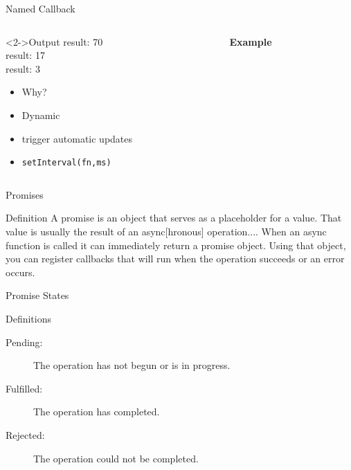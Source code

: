 \documentclass[pdf,table]{beamer}
\begin{document}
\begin{frame}{Named Callback}
	\begin{columns}[T]
		\begin{column}{0.48\textwidth}
			\begin{block}<2->{Output}
				result: 70 \\ result: 17 \\ result: 3
			\end{block}
			\begin{itemize}
				\item Why?
				\item Dynamic
				\item trigger automatic updates
				\item {\tt setInterval(fn,ms)}
			\end{itemize}
			
		\end{column}
		\begin{column}{0.48\textwidth}
			{\bf Example}
			
		\end{column}
	\end{columns}	
\end{frame}



\begin{frame}{Promises \cite{liskov:88}}
	\begin{block}{Definition \cite{parker:2015}}
		A promise is an object that serves as a placeholder for a value. That value is usually the result of an async[hronous] operation....
		When an async function is called it can immediately return a promise object. Using that object, you can register callbacks that will run when the operation succeeds or an error occurs.
	\end{block}
\end{frame}


\begin{frame}{Promise States \cite{parker:2015}}
	\begin{block}{Definitions}
		\begin{description}
			\item[Pending:] The operation has not begun or is in progress.
			\item[Fulfilled:] The operation has completed.
			\item[Rejected:] The operation could not be completed.
		\end{description}
	\end{block}
\end{frame}
\end{document}

